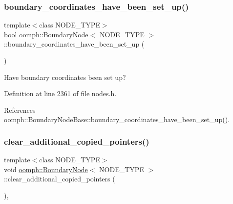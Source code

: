 \subsubsection{\texorpdfstring{boundary\+\_\+coordinates\+\_\+have\+\_\+been\+\_\+set\+\_\+up()}{boundary\_coordinates\_have\_been\_set\_up()}}
{\footnotesize\ttfamily template$<$class N\+O\+D\+E\+\_\+\+T\+Y\+PE$>$ \\
bool \hyperlink{classoomph_1_1BoundaryNode}{oomph\+::\+Boundary\+Node}$<$ N\+O\+D\+E\+\_\+\+T\+Y\+PE $>$\+::boundary\+\_\+coordinates\+\_\+have\+\_\+been\+\_\+set\+\_\+up (\begin{DoxyParamCaption}{ }\end{DoxyParamCaption})\hspace{0.3cm}{\ttfamily [inline]}}



Have boundary coordinates been set up? 



Definition at line 2361 of file nodes.\+h.



References oomph\+::\+Boundary\+Node\+Base\+::boundary\+\_\+coordinates\+\_\+have\+\_\+been\+\_\+set\+\_\+up().

\mbox{\label{classoomph_1_1BoundaryNode_ab0ef928d7afc2ea759d35dbf4690b341}} 
\subsubsection{\texorpdfstring{clear\+\_\+additional\+\_\+copied\+\_\+pointers()}{clear\_additional\_copied\_pointers()}}
{\footnotesize\ttfamily template$<$class N\+O\+D\+E\+\_\+\+T\+Y\+PE$>$ \\
void \hyperlink{classoomph_1_1BoundaryNode}{oomph\+::\+Boundary\+Node}$<$ N\+O\+D\+E\+\_\+\+T\+Y\+PE $>$\+::clear\+\_\+additional\+\_\+copied\+\_\+pointers (\begin{DoxyParamCaption}{ }\end{DoxyParamCaption})\hspace{0.3cm}{\ttfamily [inline]}, {\ttfamily [private]}}



